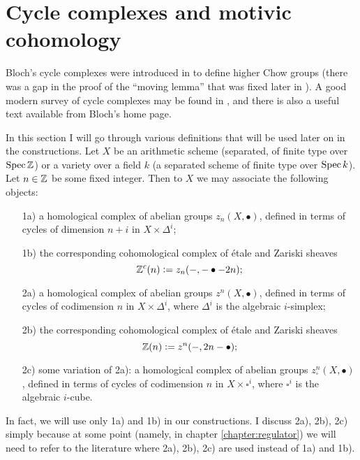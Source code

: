 
\section{Cycle complexes and motivic cohomology}
\label{section:review-of-cycle-complexes}

Bloch's cycle complexes were introduced in \cite{Bloch-1986} to define higher
Chow groups (there was a gap in the proof of the ``moving lemma'' that was fixed
later in \cite{Bloch-moving-lemma}). A good modern survey of cycle complexes may
be found in \cite{Geisser-survey}, and there is also a useful text
\cite{Bloch-cubical} available from Bloch's home page.

In this section I will go through various definitions that will be used later on
in the constructions. Let $X$ be an arithmetic scheme (separated, of finite type
over $\operatorname{Spec} \mathbb{Z}$) or a variety over a field $k$ (a separated scheme of finite
type over $\operatorname{Spec} k$). Let $n\in \mathbb{Z}$ be some fixed integer. Then to $X$ we may
associate the following objects:

\begin{enumerate}
\item[1a)] a homological complex of abelian groups $z_n (X, \bullet)$, defined
  in terms of cycles of dimension $n+i$ in $X\times \Delta^i$;

\item[1b)] the corresponding cohomological complex of étale and Zariski sheaves
  $$\mathbb{Z}^c (n) \mathrel{\mathop:}= z_n (-, -\bullet-2n);$$

\item[2a)] a homological complex of abelian groups $z^n (X, \bullet)$, defined
  in terms of cycles of codimension $n$ in $X\times \Delta^i$, where $\Delta^i$
  is the algebraic $i$-simplex;

\item[2b)] the corresponding cohomological complex of étale and Zariski sheaves
  $$\mathbb{Z} (n) \mathrel{\mathop:}= z^n (-, 2n-\bullet);$$

\item[2c)] some variation of 2a): a homological complex of abelian groups
  $z^n_\square (X, \bullet)$, defined in terms of cycles of codimension $n$ in
  $X\times \square^i$, where $\square^i$ is the algebraic $i$-cube.
\end{enumerate}

In fact, we will use only 1a) and 1b) in our constructions. I discuss 2a), 2b),
2c) simply because at some point (namely, in chapter \ref{chapter:regulator}) we
will need to refer to the literature where 2a), 2b), 2c) are used instead of 1a)
and 1b).

